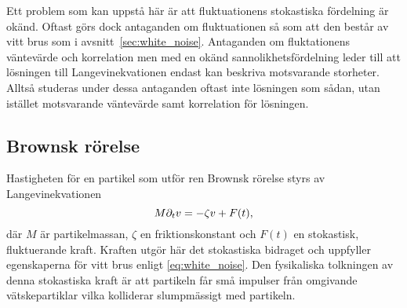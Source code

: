 Ett problem som kan uppstå här är att fluktuationens stokastiska fördelning är okänd. Oftast görs dock antaganden om fluktuationen så som att den består av vitt brus som i avsnitt~\ref{sec:white_noise}. 
Antaganden om fluktationens väntevärde och korrelation men med en okänd sannolikhetsfördelning leder till att lösningen till Langevinekvationen endast kan beskriva motsvarande storheter. Alltså studeras under dessa antaganden oftast inte lösningen som sådan, utan istället motsvarande väntevärde samt korrelation för lösningen.  






\subsection{Brownsk rörelse}\label{sec:brown}
Hastigheten för en partikel som utför ren Brownsk rörelse styrs av
Langevinekvationen~\cite{Mazo_Brownian2002} 
\begin{equation} \label{eq:Brownian_SDE}
    M\partial_tv=-\zeta v + F(t),
\end{equation}
där $M$ är partikelmassan, $\zeta$ en friktionskonstant och $F(t)$ en
stokastisk, fluktuerande kraft. Kraften utgör här det stokastiska
bidraget och uppfyller egenskaperna för vitt brus enligt \eqref{eq:white_noise}.
Den fysikaliska tolkningen av denna stokastiska kraft är att partikeln
får små impulser från omgivande vätskepartiklar vilka kolliderar
slumpmässigt med partikeln.  

